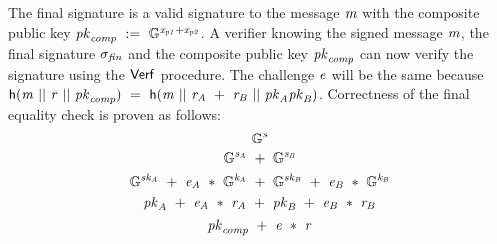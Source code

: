 \fbox{
    \parbox{\textwidth}{
        \procedure[linenumbering, syntaxhighlight=auto]{$\procSetupPartSig{\varSecParam}$}{
            \varNonce \sample \cnstIntegersPrimeWithoutZero{\varPrime} \\
            \varRand \opAssign \funGen{\varRand} \\
            \pcreturn (\varNonce, \varRand)
        }
        \procedure[linenumbering, syntaxhighlight=auto]{$\procGenPartSig{\varMsg}{\varSecKeyAlice}{\varNonceAlice}{\varPubKeyBob}{\varRandBob}$} {
            \varSchnorrChallenge \opAssign \funHash{\varMsg \opConc \varRandAlice \opAdd \varRandBob \opConc \varPubKeyAlice \opAdd \varPubKeyBob} \\
            \varS \opAssign \varSecKeyAlice \opAdd \varSchnorrChallenge \opAdd \varNonceAlice \\
            \pcreturn \varSigAlice \opAssign (\varS
        } \\[2\baselineskip]
        \procedure[linenumbering, syntaxhighlight=auto]{$\procVerfPartSig{\varMsg}{\varSecKeyAlice}{\varNonceAlice}{\varPubKeyBob}{\varRandBob}{\varSigBob}$} {
            \varSchnorrChallenge \opAssign \funHash{\varMsg \opConc \varRandAlice \opAdd \varRandBob \opConc \varPubKeyAlice \opAdd \varPubKeyBob} \\
            \varS \opAssign \opAccess{\varSigBob}{\varS} \\
            \pcreturn \funGen{\varS} \opEq \varPubKeyBob \opAdd \varSchnorrChallenge \opMult \varRandBob
        } \\[2\baselineskip]
        \procedure[linenumbering, syntaxhighlight=auto]{$\procFinSig{\varSigAlice}{\varSigBob}{\varRandAlice}{\varRandBob}$} {
            \varS_\varAlice \opAssign \opAccess{\varSigAlice}{\varS} \\
            \varS_\varBob \opAssign \opAccess{\varSigBob}{\varS} \\
            \pcreturn \varSigFin \opAssign (\varS \opAssign \varS_\varAlice \opAdd \varS_\varBob \opSeperate \varRand \opAssign \varRandAlice \opAdd \varRandBob)
        }
    }
}

The final signature is a valid signature to the message $\mathit{m}$ with the composite public key $\mathit{pk}_{\mathit{comp}} ~:=~ \mathbb{G}^{\mathit{x}_{\mathit{p1}} + \mathit{x}_{\mathit{p2}}}$.
A verifier knowing the signed message $\mathit{m}$, the final signature $\sigma_{\mathit{fin}}$ and the composite public key $\mathit{pk}_{\mathit{comp}}$ can now verify the signature using the $\mathsf{Verf}$ procedure.
The challenge $\mathit{e}$ will be the same because
$\mathsf{h} (\mathit{m} ~||~ \mathit{r} ~||~ \mathit{pk}_{\mathit{comp}}) ~=~ \mathsf{h} (\mathit{m} ~||~ \mathit{r}_{\mathit{A}} ~+~ \mathit{r}_{\mathit{B}} ~||~ \mathit{pk}_{\mathit{A}} \mathit{pk}_{\mathit{B}})$.
Correctness of the final equality check is proven as follows:
\[ \mathbb{G}^{\mathit{s}} \]
\[ \mathbb{G}^{\mathit{s}_{\mathit{A}}} ~+~ \mathbb{G}^{\mathit{s}_{\mathit{B}}} \]
\[ \mathbb{G}^{\mathit{sk}_{\mathit{A}}} ~+~ \mathit{e}_{\mathit{A}} ~*~ \mathbb{G}^{\mathit{\mathit{k}_{\mathit{A}}}} ~+~ \mathbb{G}^{\mathit{sk}_{\mathit{B}}} ~+~ \mathit{e}_{\mathit{B}} ~*~ \mathbb{G}^{\mathit{\mathit{k}_{\mathit{B}}}} \]
\[ \mathit{pk}_{\mathit{A}} ~+~ \mathit{e}_{\mathit{A}} ~*~ \mathit{r}_{\mathit{A}} ~+~ \mathit{pk}_{\mathit{B}} ~+~ \mathit{e}_{\mathit{B}} ~*~ \mathit{r}_{\mathit{B}} \]
\[ \mathit{pk}_{\mathit{comp}} ~+~ \mathit{e} ~*~ \mathit{r} \]

